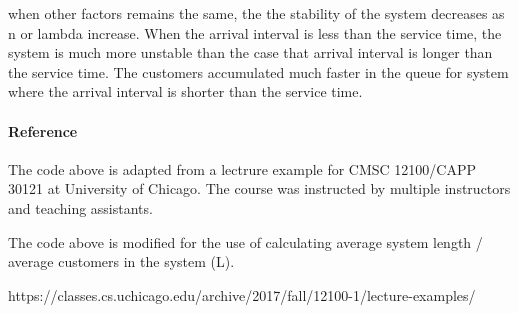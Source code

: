 \documentclass[11pt]{article}
\begin{document}
when other factors remains the same, the the stability of the system
decreases as n or lambda increase. When the arrival interval is less
than the service time, the system is much more unstable than the case
that arrival interval is longer than the service time. The customers
accumulated much faster in the queue for system where the arrival
interval is shorter than the service time.

 

    \hypertarget{reference}{%
\paragraph{Reference}\label{reference}}

The code above is adapted from a lectrure example for CMSC 12100/CAPP
30121 at University of Chicago. The course was instructed by multiple
instructors and teaching assistants.

The code above is modified for the use of calculating average system
length / average customers in the system (L).

https://classes.cs.uchicago.edu/archive/2017/fall/12100-1/lecture-examples/


    
    
    
    
\end{document}
